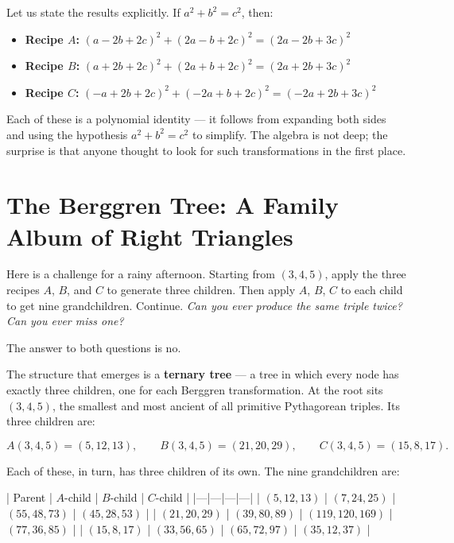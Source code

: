 \documentclass[11pt,twoside,openright]{book}
\theoremstyle{definition}
\theoremstyle{remark}
\begin{document}
Let us state the results explicitly. If $a^2 + b^2 = c^2$, then:

\begin{itemize}
  \item \textbf{Recipe $A$:} $(a - 2b + 2c)^2 + (2a - b + 2c)^2 = (2a - 2b + 3c)^2$

  \item \textbf{Recipe $B$:} $(a + 2b + 2c)^2 + (2a + b + 2c)^2 = (2a + 2b + 3c)^2$

  \item \textbf{Recipe $C$:} $(-a + 2b + 2c)^2 + (-2a + b + 2c)^2 = (-2a + 2b + 3c)^2$
\end{itemize}

Each of these is a polynomial identity --- it follows from expanding both sides and using the hypothesis $a^2 + b^2 = c^2$ to simplify. The algebra is not deep; the surprise is that anyone thought to look for such transformations in the first place.


\section{The Berggren Tree: A Family Album of Right Triangles}

Here is a challenge for a rainy afternoon. Starting from $(3, 4, 5)$, apply the three recipes $A$, $B$, and $C$ to generate three children. Then apply $A$, $B$, $C$ to each child to get nine grandchildren. Continue. \textit{Can you ever produce the same triple twice? Can you ever miss one?}

The answer to both questions is no.

The structure that emerges is a \textbf{ternary tree} --- a tree in which every node has exactly three children, one for each Berggren transformation. At the root sits $(3, 4, 5)$, the smallest and most ancient of all primitive Pythagorean triples. Its three children are:

\[A(3,4,5) = (5, 12, 13), \qquad B(3,4,5) = (21, 20, 29), \qquad C(3,4,5) = (15, 8, 17).\]

Each of these, in turn, has three children of its own. The nine grandchildren are:

| Parent | $A$-child | $B$-child | $C$-child |
|---|---|---|---|
| $(5, 12, 13)$ | $(7, 24, 25)$ | $(55, 48, 73)$ | $(45, 28, 53)$ |
| $(21, 20, 29)$ | $(39, 80, 89)$ | $(119, 120, 169)$ | $(77, 36, 85)$ |
| $(15, 8, 17)$ | $(33, 56, 65)$ | $(65, 72, 97)$ | $(35, 12, 37)$ |
\end{document}
